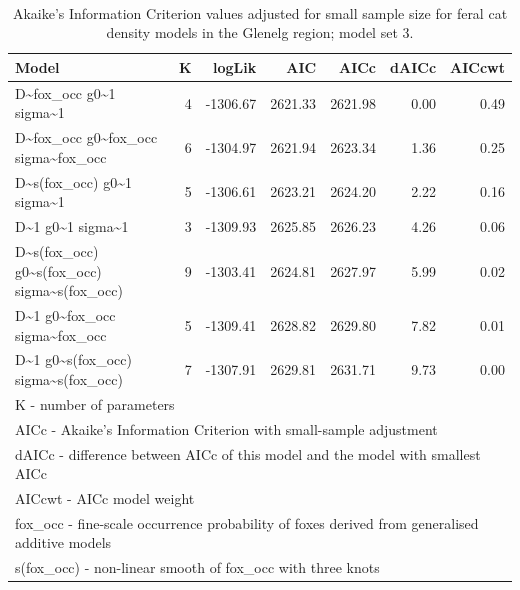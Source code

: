 \documentclass[11pt,a4paper,titlepage,twoside,openright]{style/unimelbthesis}
\begin{document}
\begin{mainmatter}
\newpage

\(~\)

\(~\)

\(~\)

\begingroup\fontsize{10}{12}\selectfont
\begin{longtable}[t]{lrrrrrr}
\caption{\label{tab:density-aic-g-3}Akaike's Information Criterion values adjusted for small sample size for feral cat density models in the Glenelg region; model set 3.}\\
\toprule
Model & K & logLik & AIC & AICc & dAICc & AICcwt\\
\midrule
D\textasciitilde{}fox\_occ g0\textasciitilde{}1 sigma\textasciitilde{}1 & 4 & -1306.67 & 2621.33 & 2621.98 & 0.00 & 0.49\\
D\textasciitilde{}fox\_occ g0\textasciitilde{}fox\_occ sigma\textasciitilde{}fox\_occ & 6 & -1304.97 & 2621.94 & 2623.34 & 1.36 & 0.25\\
D\textasciitilde{}s(fox\_occ) g0\textasciitilde{}1 sigma\textasciitilde{}1 & 5 & -1306.61 & 2623.21 & 2624.20 & 2.22 & 0.16\\
D\textasciitilde{}1 g0\textasciitilde{}1 sigma\textasciitilde{}1 & 3 & -1309.93 & 2625.85 & 2626.23 & 4.26 & 0.06\\
D\textasciitilde{}s(fox\_occ) g0\textasciitilde{}s(fox\_occ) sigma\textasciitilde{}s(fox\_occ) & 9 & -1303.41 & 2624.81 & 2627.97 & 5.99 & 0.02\\
\addlinespace
D\textasciitilde{}1 g0\textasciitilde{}fox\_occ sigma\textasciitilde{}fox\_occ & 5 & -1309.41 & 2628.82 & 2629.80 & 7.82 & 0.01\\
D\textasciitilde{}1 g0\textasciitilde{}s(fox\_occ) sigma\textasciitilde{}s(fox\_occ) & 7 & -1307.91 & 2629.81 & 2631.71 & 9.73 & 0.00\\
\bottomrule
\multicolumn{7}{l}{\rule{0pt}{1em}K - number of parameters}\\
\multicolumn{7}{l}{\rule{0pt}{1em}AICc - Akaike's Information Criterion with small-sample adjustment}\\
\multicolumn{7}{l}{\rule{0pt}{1em}dAICc - difference between AICc of this model and the model with smallest AICc}\\
\multicolumn{7}{l}{\rule{0pt}{1em}AICcwt - AICc model weight}\\
\multicolumn{7}{l}{\rule{0pt}{1em}fox\_occ - fine-scale occurrence probability of foxes derived from generalised additive models}\\
\multicolumn{7}{l}{\rule{0pt}{1em}s(fox\_occ) - non-linear smooth of fox\_occ with three knots}\\
\end{longtable}
\endgroup{}


\end{mainmatter}
\end{document}
